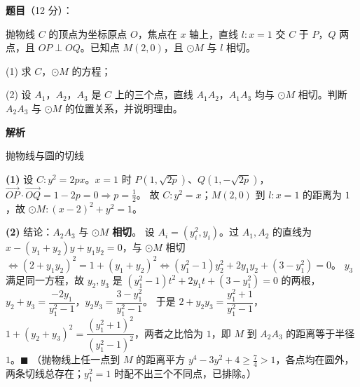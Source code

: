\begin{answer}

\textbf{题目}（12 分）：

抛物线 $C$ 的顶点为坐标原点 $O$，焦点在 $x$ 轴上，直线 $l:x=1$ 交 $C$ 于 $P$，$Q$ 两点，且 $OP\perp OQ$。已知点 $M(2,0)$，且 $\odot M$ 与 $l$ 相切。

  (1) 求 $C$，$\odot M$ 的方程；

  (2) 设 $A_1$，$A_2$，$A_3$ 是 $C$ 上的三个点，直线 $A_1A_2$，$A_1A_3$ 均与 $\odot M$ 相切。判断 $A_2A_3$ 与 $\odot M$ 的位置关系，并说明理由。

\textbf{解析}

抛物线与圆的切线

\begin{gktip}
\textbf{(1)} 设 $C:y^2=2px$。$x=1$ 时 $P(1,\sqrt{2p})$、$Q(1,-\sqrt{2p})$，$\overrightarrow{OP}\cdot\overrightarrow{OQ}=1-2p=0\Rightarrow p=\tfrac12$。
故 $C:y^2=x$；$M(2,0)$ 到 $l:x=1$ 的距离为 $1$，故 $\odot M:(x-2)^2+y^2=1$。

\textbf{(2)} 结论：$A_2A_3$ 与 $\odot M$ \textbf{相切}。
设 $A_i=(y_i^2,y_i)$。过 $A_1,A_2$ 的直线为 $x-(y_1+y_2)y+y_1y_2=0$，与 $\odot M$ 相切 $\iff(2+y_1y_2)^2=1+(y_1+y_2)^2\iff(y_1^2-1)y_2^2+2y_1y_2+(3-y_1^2)=0$。
$y_3$ 满足同一方程，故 $y_2,y_3$ 是 $(y_1^2-1)t^2+2y_1t+(3-y_1^2)=0$ 的两根，$y_2+y_3=\dfrac{-2y_1}{y_1^2-1}$，$y_2y_3=\dfrac{3-y_1^2}{y_1^2-1}$。
于是 $2+y_2y_3=\dfrac{y_1^2+1}{y_1^2-1}$，$1+(y_2+y_3)^2=\dfrac{(y_1^2+1)^2}{(y_1^2-1)^2}$，两者之比恰为 $1$，即 $M$ 到 $A_2A_3$ 的距离等于半径 $1$。$\blacksquare$
（抛物线上任一点到 $M$ 的距离平方 $y^4-3y^2+4\geqslant\tfrac74>1$，各点均在圆外，两条切线总存在；$y_1^2=1$ 时配不出三个不同点，已排除。）
\end{gktip}



\end{answer}

